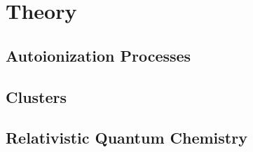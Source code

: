 \chapter{Theory}

\section{Autoionization Processes}
\section{Clusters}
\section{Relativistic Quantum Chemistry}
 
 
